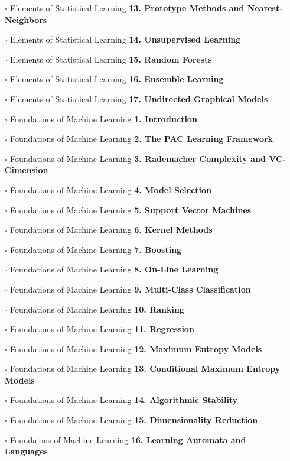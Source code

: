 \documentclass[a4, landscape, 12pt]{article}
\newcommand{\checkbox}{$\square$}%
\begin{document}
\begin{itemize}
{}
\item [\checkbox]  Elements of Statistical Learning \textbf{ 13. Prototype Methods and Nearest-Neighbors
}
\item [\checkbox]  Elements of Statistical Learning \textbf{ 14. Unsupervised Learning
}
\item [\checkbox]  Elements of Statistical Learning \textbf{ 15. Random Forests
}
\item [\checkbox]  Elements of Statistical Learning \textbf{ 16. Ensemble Learning
}
\item [\checkbox]  Elements of Statistical Learning \textbf{ 17. Undirected Graphical Models
}
\item [\checkbox]  Foundations of Machine Learning \textbf{ 1. Introduction
}
\item [\checkbox]  Foundations of Machine Learning \textbf{ 2. The PAC Learning Framework
}
\item [\checkbox]  Foundations of Machine Learning \textbf{ 3. Rademacher Complexity and VC-Cimension
}
\item [\checkbox]  Foundations of Machine Learning \textbf{ 4. Model Selection
}
\item [\checkbox]  Foundations of Machine Learning \textbf{ 5. Support Vector Machines
}
\item [\checkbox]  Foundations of Machine Learning \textbf{ 6. Kernel Methods
}
\item [\checkbox]  Foundations of Machine Learning \textbf{ 7. Boosting
}
\item [\checkbox]  Foundations of Machine Learning \textbf{ 8. On-Line Learning
}
\item [\checkbox]  Foundations of Machine Learning \textbf{ 9. Multi-Class Classification
}
\item [\checkbox]  Foundations of Machine Learning \textbf{ 10. Ranking
}
\item [\checkbox]  Foundations of Machine Learning \textbf{ 11. Regression
}
\item [\checkbox]  Foundations of Machine Learning \textbf{ 12. Maximum Entropy Models
}
\item [\checkbox]  Foundations of Machine Learning \textbf{ 13. Conditional Maximum Entropy Models
}
\item [\checkbox]  Foundations of Machine Learning \textbf{ 14. Algorithmic Stability
}
\item [\checkbox]  Foundations of Machine Learning \textbf{ 15. Dimensionality Reduction
}
\item [\checkbox]  Foundaions of Machine Learning \textbf{ 16. Learning Automata and Languages
}
\end{itemize}
\end{document}
